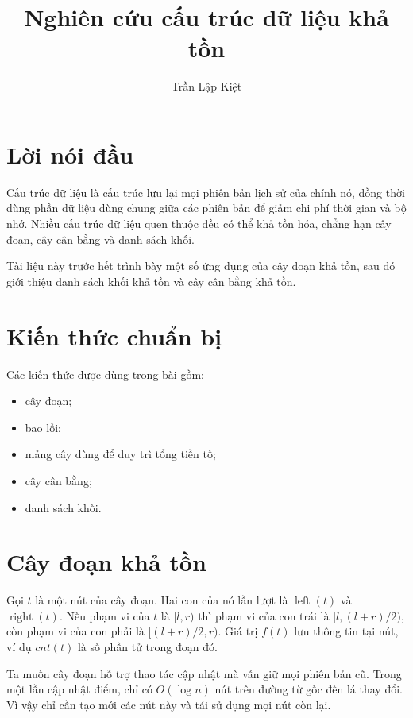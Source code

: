 \documentclass[11pt]{article}
\title{Nghiên cứu cấu trúc dữ liệu khả tồn}
\author{Trần Lập Kiệt}
\date{}
\begin{document}
\maketitle
{}

\section{Lời nói đầu}

Cấu trúc dữ liệu  là cấu trúc lưu lại mọi phiên bản lịch
sử của chính nó, đồng thời dùng phần dữ liệu dùng chung giữa các phiên
bản để giảm chi phí thời gian và bộ nhớ. Nhiều cấu trúc dữ liệu quen
thuộc đều có thể khả tồn hóa, chẳng hạn cây đoạn, cây cân bằng và danh
sách khối.

Tài liệu này trước hết trình bày một số ứng dụng của cây đoạn khả tồn,
sau đó giới thiệu danh sách khối khả tồn và cây cân bằng khả tồn.

\section{Kiến thức chuẩn bị}

Các kiến thức được dùng trong bài gồm:
\begin{itemize}
  \item cây đoạn;
  \item bao lồi;
  \item mảng cây dùng để duy trì tổng tiền tố;
  \item cây cân bằng;
  \item danh sách khối.
\end{itemize}

\section{Cây đoạn khả tồn}

Gọi $t$ là một nút của cây đoạn. Hai con của nó lần lượt là
$\operatorname{left}(t)$ và $\operatorname{right}(t)$. Nếu phạm vi của
$t$ là $[l,r)$ thì phạm vi của con trái là $[l,(l+r)/2)$, còn phạm vi
của con phải là $[(l+r)/2,r)$. Giá trị $f(t)$ lưu thông tin tại nút,
ví dụ $cnt(t)$ là số phần tử trong đoạn đó.

Ta muốn cây đoạn hỗ trợ thao tác cập nhật mà vẫn giữ mọi phiên bản cũ.
Trong một lần cập nhật điểm, chỉ có $O(\log n)$ nút trên đường từ gốc
đến lá thay đổi. Vì vậy chỉ cần tạo mới các nút này và tái sử dụng mọi
nút còn lại.
\end{document}
